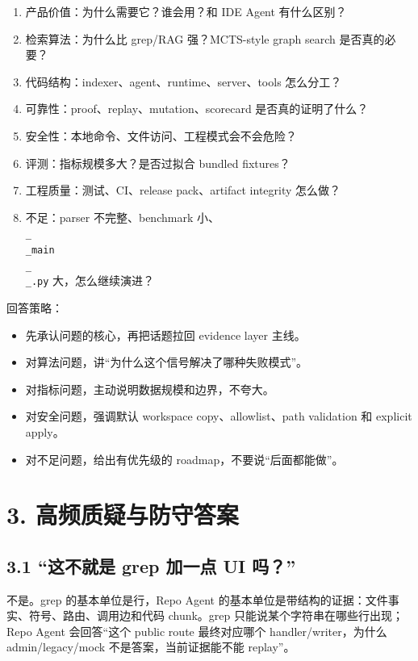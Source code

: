 \documentclass[UTF8,12pt,openany]{ctexbook}
\begin{document}
\begin{enumerate}
\item 产品价值：为什么需要它？谁会用？和 IDE Agent 有什么区别？
\item 检索算法：为什么比 grep/RAG 强？MCTS-style graph search 是否真的必要？
\item 代码结构：indexer、agent、runtime、server、tools 怎么分工？
\item 可靠性：proof、replay、mutation、scorecard 是否真的证明了什么？
\item 安全性：本地命令、文件访问、工程模式会不会危险？
\item 评测：指标规模多大？是否过拟合 bundled fixtures？
\item 工程质量：测试、CI、release pack、artifact integrity 怎么做？
\item 不足：parser 不完整、benchmark 小、\texttt{\\_\\_main\\_\\_.py} 大，怎么继续演进？
\end{enumerate}

回答策略：\par

\begin{itemize}
\item 先承认问题的核心，再把话题拉回 evidence layer 主线。
\item 对算法问题，讲“为什么这个信号解决了哪种失败模式”。
\item 对指标问题，主动说明数据规模和边界，不夸大。
\item 对安全问题，强调默认 workspace copy、allowlist、path validation 和 explicit apply。
\item 对不足问题，给出有优先级的 roadmap，不要说“后面都能做”。
\end{itemize}

\section{3. 高频质疑与防守答案}

\subsection{3.1 “这不就是 grep 加一点 UI 吗？”}

不是。grep 的基本单位是行，Repo Agent 的基本单位是带结构的证据：文件事实、符号、路由、调用边和代码 chunk。grep 只能说某个字符串在哪些行出现；Repo Agent 会回答“这个 public route 最终对应哪个 handler/writer，为什么 admin/legacy/mock 不是答案，当前证据能不能 replay”。  \par
\end{document}

